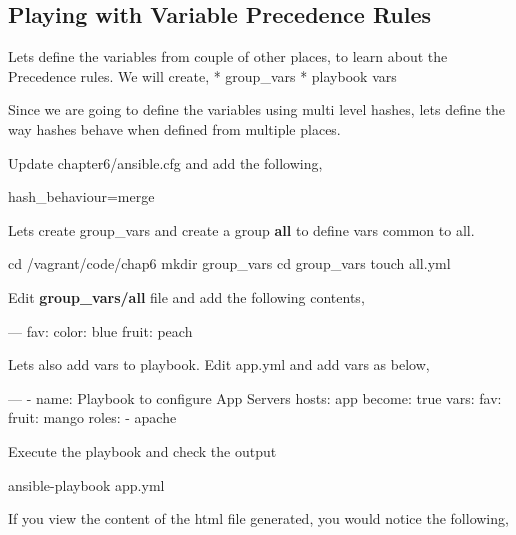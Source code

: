 \subsection{Playing with Variable Precedence Rules}

Lets define the variables from couple of other places, to learn about the Precedence rules. We will create,\newline
   * group\_vars\newline
   * playbook vars  

Since we are going to define the variables using multi level hashes, lets define the way hashes behave when defined from multiple places.  

Update chapter6/ansible.cfg and add the following,  

\begin{code}
hash_behaviour=merge
\end{code}

Lets create group\_vars and create a group \textbf{all} to define vars common to all.  

\begin{code}
cd /vagrant/code/chap6
mkdir group_vars
cd group_vars
touch all.yml
\end{code}

Edit \textbf{group\_vars/all} file and add the following contents,  

\begin{code}
---
  fav:
    color: blue
    fruit: peach

\end{code}

Lets also add vars to playbook. Edit app.yml and add vars as below,  

\begin{code}
---
  - name: Playbook to configure App Servers
    hosts: app
    become: true
    vars:
      fav:
        fruit: mango
    roles:
    - apache

\end{code}

Execute the playbook and check the output  

\begin{code}

ansible-playbook app.yml

\end{code}

If you view the content of the html file generated, you would notice the following,  

